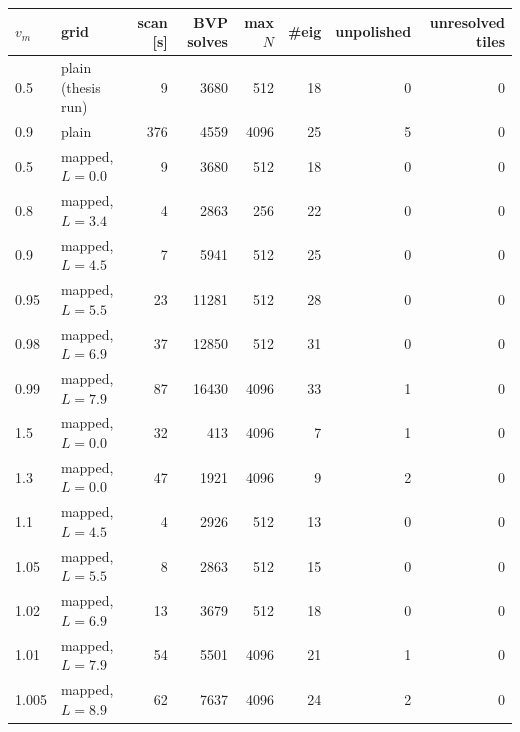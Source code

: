 \begin{tabular}{llrrrrrr}
\toprule
$v_m$ & grid & scan [s] & BVP solves & max $N$ & \#eig & unpolished & unresolved tiles\\
\midrule
0.5 & plain (thesis run) & 9 & 3680 & 512 & 18 & 0 & 0\\
0.9 & plain & 376 & 4559 & 4096 & 25 & 5 & 0\\
\midrule
0.5 & mapped, $L=0.0$ & 9 & 3680 & 512 & 18 & 0 & 0\\
0.8 & mapped, $L=3.4$ & 4 & 2863 & 256 & 22 & 0 & 0\\
0.9 & mapped, $L=4.5$ & 7 & 5941 & 512 & 25 & 0 & 0\\
0.95 & mapped, $L=5.5$ & 23 & 11281 & 512 & 28 & 0 & 0\\
0.98 & mapped, $L=6.9$ & 37 & 12850 & 512 & 31 & 0 & 0\\
0.99 & mapped, $L=7.9$ & 87 & 16430 & 4096 & 33 & 1 & 0\\
1.5 & mapped, $L=0.0$ & 32 & 413 & 4096 & 7 & 1 & 0\\
1.3 & mapped, $L=0.0$ & 47 & 1921 & 4096 & 9 & 2 & 0\\
1.1 & mapped, $L=4.5$ & 4 & 2926 & 512 & 13 & 0 & 0\\
1.05 & mapped, $L=5.5$ & 8 & 2863 & 512 & 15 & 0 & 0\\
1.02 & mapped, $L=6.9$ & 13 & 3679 & 512 & 18 & 0 & 0\\
1.01 & mapped, $L=7.9$ & 54 & 5501 & 4096 & 21 & 1 & 0\\
1.005 & mapped, $L=8.9$ & 62 & 7637 & 4096 & 24 & 2 & 0\\
\bottomrule
\end{tabular}
